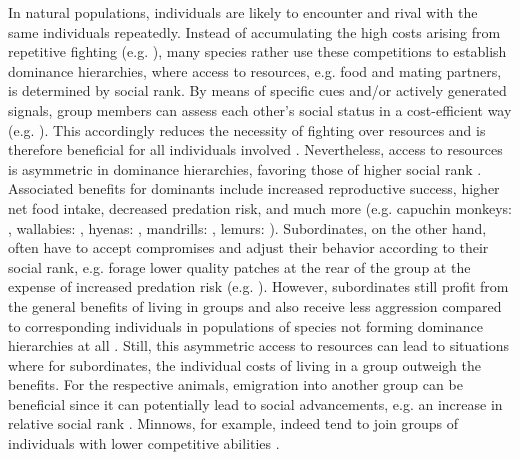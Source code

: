 In natural populations, individuals are likely to encounter and rival with the same individuals repeatedly. Instead of accumulating the high costs arising from repetitive fighting (e.g. \citealp{Briffa2004}), many species rather use these competitions to establish dominance hierarchies, where access to resources, e.g. food and mating partners, is determined by social rank. By means of specific cues and/or actively generated signals, group members can assess each other's social status in a cost-efficient way (e.g. \citealp{Cluttonbrock1979, Fernald2014, Cornhill2020}). This accordingly reduces the necessity of fighting over resources and is therefore beneficial for all individuals involved \citep{Cluttonbrock1979, Janson1985, Creel1996}. Nevertheless, access to resources is asymmetric in dominance hierarchies, favoring those of higher social rank \citep{Janson1985, Wauters1992, Sapolsky2005, Taves2009}. Associated benefits for dominants include increased reproductive success, higher net food intake, decreased predation risk, and much more (e.g. capuchin monkeys: \citealp{Janson1985, Jason1990}, wallabies: \citealp{Blumstein2001}, hyenas: \citealp{Engh2002}, mandrills: \citealp{Charpentier2005}, lemurs: \citealp{Kappeler2008}). Subordinates, on the other hand, often have to accept compromises and adjust their behavior according to their social rank, e.g. forage lower quality patches at the rear of the group at the expense of increased predation risk (e.g. \citealp{Jason1990}). However, subordinates still profit from the general benefits of living in groups and also receive less aggression compared to corresponding individuals in populations of species not forming dominance hierarchies at all \citep{Sapolsky2005}. Still, this asymmetric access to resources can lead to situations where for subordinates, the individual costs of living in a group outweigh the benefits. For the respective animals, emigration into another group can be beneficial since it can potentially lead to social advancements, e.g. an increase in relative social rank \citep{Janson1985, Chapman1995, Markham2017}. Minnows, for example, indeed tend to join groups of individuals with lower competitive abilities \citep{Metcalfe1995}.

